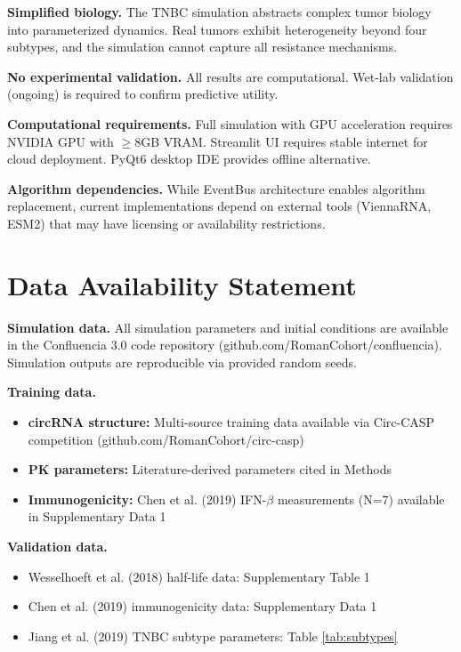 \documentclass[12pt]{article}
\begin{document}
\textbf{Simplified biology.} The TNBC simulation abstracts complex tumor biology into parameterized dynamics. Real tumors exhibit heterogeneity beyond four subtypes, and the simulation cannot capture all resistance mechanisms.

\textbf{No experimental validation.} All results are computational. Wet-lab validation (ongoing) is required to confirm predictive utility.

\textbf{Computational requirements.} Full simulation with GPU acceleration requires NVIDIA GPU with $\geq$8GB VRAM. Streamlit UI requires stable internet for cloud deployment. PyQt6 desktop IDE provides offline alternative.

\textbf{Algorithm dependencies.} While EventBus architecture enables algorithm replacement, current implementations depend on external tools (ViennaRNA, ESM2) that may have licensing or availability restrictions.

\section{Data Availability Statement}

\textbf{Simulation data.} All simulation parameters and initial conditions are available in the Confluencia 3.0 code repository (github.com/RomanCohort/confluencia). Simulation outputs are reproducible via provided random seeds.

\textbf{Training data.}
\begin{itemize}
\item \textbf{circRNA structure:} Multi-source training data available via Circ-CASP competition (github.com/RomanCohort/circ-casp)
\item \textbf{PK parameters:} Literature-derived parameters cited in Methods
\item \textbf{Immunogenicity:} Chen et al. (2019) IFN-$\beta$ measurements (N=7) available in Supplementary Data 1
\end{itemize}

\textbf{Validation data.}
\begin{itemize}
\item Wesselhoeft et al. (2018) half-life data: Supplementary Table 1
\item Chen et al. (2019) immunogenicity data: Supplementary Data 1
\item Jiang et al. (2019) TNBC subtype parameters: Table \ref{tab:subtypes}
\end{itemize}
\end{document}
